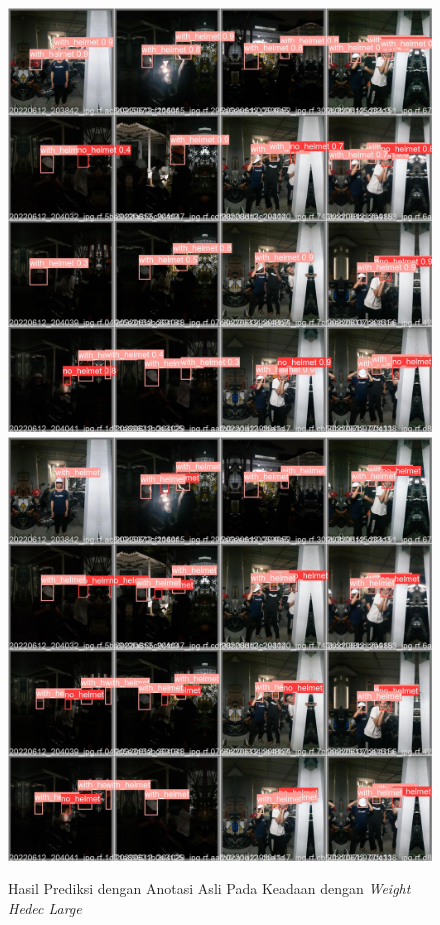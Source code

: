 \begin{figure}[ht]
  \centering
  \includegraphics[scale=0.1]{gambar/train_v2_val/low_ligjt/customLarge/val_batch0_pred.jpg}
  \includegraphics[scale=0.1]{gambar/train_v2_val/low_ligjt/customLarge/val_batch0_labels.jpg}
  \caption{Hasil Prediksi dengan Anotasi Asli Pada Keadaan dengan \emph{Weight Hedec Large}}
\end{figure}